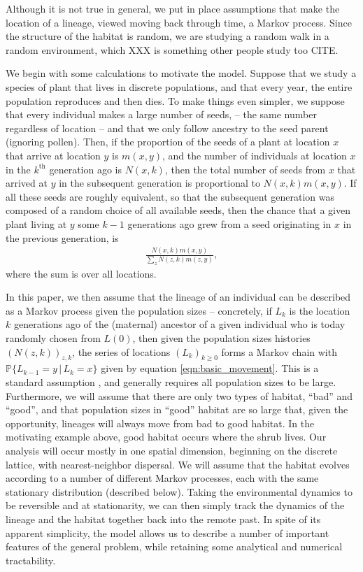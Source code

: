 \documentclass{article}
\renewcommand{\P}{\mathbb{P}}
\newcommand{\given}{\,\vert\,}
\begin{document}
Although it is not true in general,
we put in place assumptions that make the location of a lineage,
viewed moving back through time, a Markov process.
Since the structure of the habitat is random,
we are studying a random walk in a random environment,
which XXX is something other people study too CITE.

We begin with some calculations to motivate the model.
Suppose that we study a species of plant that lives in discrete populations,
and that every year, the entire population reproduces and then dies.
To make things even simpler, we suppose that every individual makes a large number of seeds,
-- the same number regardless of location --
and that we only follow ancestry to the seed parent (ignoring pollen).
Then, if the proportion of the seeds of a plant at location $x$
that arrive at location $y$ is $m(x,y)$,
and the number of individuals at location $x$ in the $k^\text{th}$ generation ago is $N(x,k)$,
then the total number of seeds from $x$ that arrived at $y$ in the subsequent generation
is proportional to $N(x,k) m(x,y)$.
If all these seeds are roughly equivalent, so that the subsequent generation was composed of a random choice
of all available seeds, then the chance that a given plant living at $y$ some $k-1$ generations ago
grew from a seed originating in $x$ in the previous generation, is
\begin{align} \label{eqn:basic_movement}
    \frac{N(x,k) m(x,y)}{\sum_z N(z,k) m(z,y)},
\end{align}
where the sum is over all locations.

In this paper,
we then assume that the lineage of an individual can be described as a Markov process given the population sizes --
concretely, if $L_k$ is the location $k$ generations ago 
of the (maternal) ancestor of a given individual who is today randomly chosen from $L(0)$,
then given the population sizes histories $(N(z,k))_{z,k}$,
the series of locations $(L_k)_{k \ge 0}$ forms a Markov chain with 
$\P\{L_{k-1} = y \given L_k = x\}$ given by equation \eqref{eqn:basic_movement}.
This is a standard assumption \citep{wakeley2009coalescent},
and generally requires all population sizes to be large.
Furthermore, we will assume that there are only two types of habitat, ``bad'' and ``good'',
and that population sizes in ``good'' habitat are so large that, given the opportunity,
lineages will always move from bad to good habitat.
In the motivating example above, good habitat occurs where the shrub lives.
Our analysis will occur mostly in one spatial dimension,
beginning on the discrete lattice, with nearest-neighbor dispersal.
We will assume that the habitat evolves according to a number of different Markov processes,
each with the same stationary distribution (described below).
Taking the environmental dynamics to be reversible and at stationarity,
we can then simply track the dynamics of the lineage and the habitat together
back into the remote past.
In spite of its apparent simplicity,
the model allows us to describe a number of important features of the general problem,
while retaining some analytical and numerical tractability.
\end{document}
